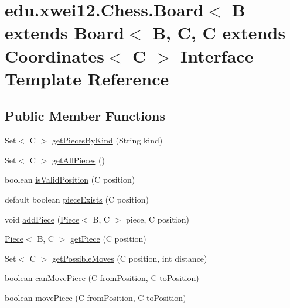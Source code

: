\hypertarget{interfaceedu_1_1xwei12_1_1_chess_1_1_board}{}\section{edu.\+xwei12.\+Chess.\+Board$<$ B extends Board$<$ B, C, C extends Coordinates$<$ C $>$ Interface Template Reference}
\label{interfaceedu_1_1xwei12_1_1_chess_1_1_board}
\subsection*{Public Member Functions}
\begin{DoxyCompactItemize}
\item 
Set$<$ C $>$ \hyperlink{interfaceedu_1_1xwei12_1_1_chess_1_1_board_ab4029d070e024277c7f31137f0825e13}{get\+Pieces\+By\+Kind} (String kind)
\item 
Set$<$ C $>$ \hyperlink{interfaceedu_1_1xwei12_1_1_chess_1_1_board_a0eb983cbbc57f91c18491cf82e29e451}{get\+All\+Pieces} ()
\item 
boolean \hyperlink{interfaceedu_1_1xwei12_1_1_chess_1_1_board_a1975e57930598526f087a87c417ce788}{is\+Valid\+Position} (C position)
\item 
default boolean \hyperlink{interfaceedu_1_1xwei12_1_1_chess_1_1_board_a28aa78a5e6767257b20c5e12fa74afa4}{piece\+Exists} (C position)
\item 
void \hyperlink{interfaceedu_1_1xwei12_1_1_chess_1_1_board_a858f17b11b7b0a909f240b5776b35e06}{add\+Piece} (\hyperlink{classedu_1_1xwei12_1_1_chess_1_1_piece}{Piece}$<$ B, C $>$ piece, C position)
\item 
\hyperlink{classedu_1_1xwei12_1_1_chess_1_1_piece}{Piece}$<$ B, C $>$ \hyperlink{interfaceedu_1_1xwei12_1_1_chess_1_1_board_a83da497f49ab9b4b66974036d91cdcf6}{get\+Piece} (C position)
\item 
Set$<$ C $>$ \hyperlink{interfaceedu_1_1xwei12_1_1_chess_1_1_board_a9bb5bbe10001d89727ac69b9f69af96d}{get\+Possible\+Moves} (C position, int distance)
\item 
boolean \hyperlink{interfaceedu_1_1xwei12_1_1_chess_1_1_board_aa5cb738f84553447b59e1ee782f7451a}{can\+Move\+Piece} (C from\+Position, C to\+Position)
\item 
boolean \hyperlink{interfaceedu_1_1xwei12_1_1_chess_1_1_board_a4ff38fd3479c3125613dd50101c5d0ef}{move\+Piece} (C from\+Position, C to\+Position)
\end{DoxyCompactItemize}


